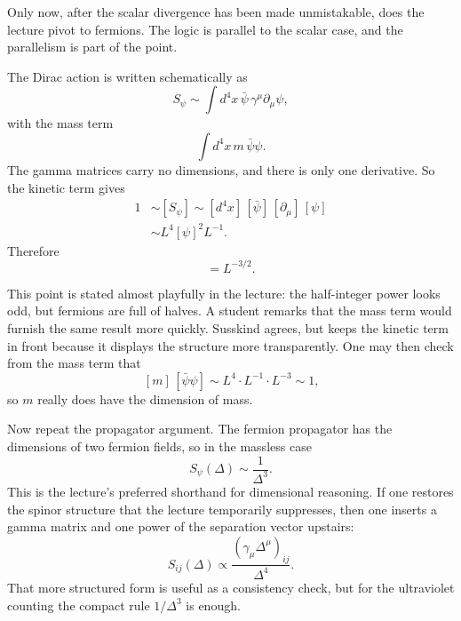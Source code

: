 Only now, after the scalar divergence has been made unmistakable, does the lecture pivot to fermions. The logic is parallel to the scalar case, and the parallelism is part of the point.

The Dirac action is written schematically as
\begin{equation}
S_\psi \sim \int d^4x\, \bar\psi\,\gamma^\mu\partial_\mu\psi ,
\end{equation}
with the mass term
\begin{equation}
\int d^4x\, m\,\bar\psi\psi .
\end{equation}
The gamma matrices carry no dimensions, and there is only one derivative. So the kinetic term gives
\begin{align}
1 &\sim [S_\psi]
   \sim [d^4x]\,[\bar\psi]\,[\partial_\mu]\,[\psi] \\
  &\sim L^4 [\psi]^2 L^{-1}.
\end{align}
Therefore
\begin{equation}
[\psi]=L^{-3/2}.
\end{equation}

This point is stated almost playfully in the lecture: the half-integer power looks odd, but fermions are full of halves. A student remarks that the mass term would furnish the same result more quickly. Susskind agrees, but keeps the kinetic term in front because it displays the structure more transparently. One may then check from the mass term that
\begin{equation}
[d^4x]\,[m]\,[\bar\psi\psi]
\sim L^4 \cdot L^{-1}\cdot L^{-3}\sim 1,
\end{equation}
so \(m\) really does have the dimension of mass.

Now repeat the propagator argument. The fermion propagator has the dimensions of two fermion fields, so in the massless case
\begin{equation}
S_\psi(\Delta)\sim \frac{1}{\Delta^3}.
\end{equation}
This is the lecture's preferred shorthand for dimensional reasoning. If one restores the spinor structure that the lecture temporarily suppresses, then one inserts a gamma matrix and one power of the separation vector upstairs:
\begin{equation}
S_{ij}(\Delta)\propto \frac{(\gamma_\mu\Delta^\mu)_{ij}}{\Delta^4}.
\end{equation}
That more structured form is useful as a consistency check, but for the ultraviolet counting the compact rule \(1/\Delta^3\) is enough.

